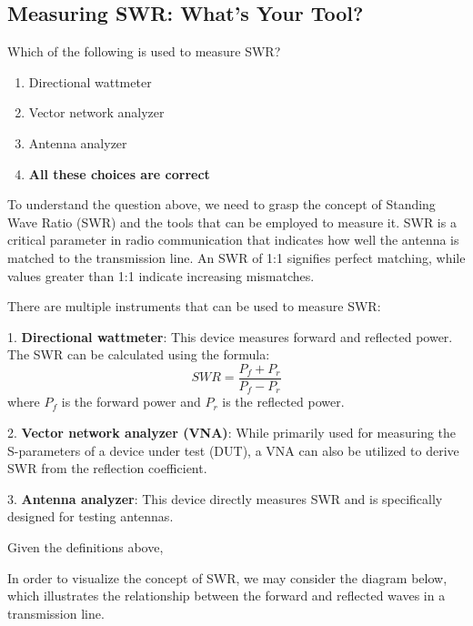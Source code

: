 \subsection{Measuring SWR: What's Your Tool?}

\begin{tcolorbox}[colback=gray!10, colframe=black, title=E4A08]
Which of the following is used to measure SWR?
\begin{enumerate}[label=\Alph*.]
    \item Directional wattmeter
    \item Vector network analyzer
    \item Antenna analyzer
    \item \textbf{All these choices are correct}
\end{enumerate} \end{tcolorbox}

To understand the question above, we need to grasp the concept of Standing Wave Ratio (SWR) and the tools that can be employed to measure it. SWR is a critical parameter in radio communication that indicates how well the antenna is matched to the transmission line. An SWR of 1:1 signifies perfect matching, while values greater than 1:1 indicate increasing mismatches.

There are multiple instruments that can be used to measure SWR:

1. \textbf{Directional wattmeter}: This device measures forward and reflected power. The SWR can be calculated using the formula:
   \[
   SWR = \frac{P_f + P_r}{P_f - P_r}
   \]
   where \(P_f\) is the forward power and \(P_r\) is the reflected power.

2. \textbf{Vector network analyzer (VNA)}: While primarily used for measuring the S-parameters of a device under test (DUT), a VNA can also be utilized to derive SWR from the reflection coefficient.

3. \textbf{Antenna analyzer}: This device directly measures SWR and is specifically designed for testing antennas.

Given the definitions above, 

In order to visualize the concept of SWR, we may consider the diagram below, which illustrates the relationship between the forward and reflected waves in a transmission line.

\begin{center}
\end{center}
